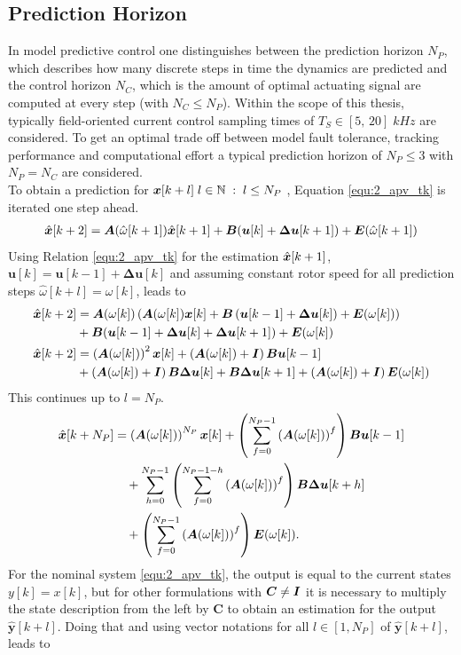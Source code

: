\subsection{Prediction Horizon} \label{sec:prediction_horizon}
In model predictive control one distinguishes between the prediction horizon $N_P$, which describes how many discrete steps in time the dynamics are predicted and the control horizon $N_C$, which is the amount of optimal actuating signal are computed at every step (with $N_C \le N_P$).
Within the scope of this thesis, typically field-oriented current control sampling times of $T_S \in [5,\, 20]\;\si{kHz}$ are considered. To get an optimal trade off between model fault tolerance, tracking performance and computational effort a typical prediction horizon of $N_P \le 3$  with $N_P = N_C$ are considered.\\
To obtain a prediction for  ${\bm{x}}[k+l]\; l\in \mathbb{N}\;:\; l\le N_P $ , Equation \eqref{equ:2_apv_tk} is iterated one step ahead.
\begin{align*}
	\hat{\bm{x}}[k+2] = \bm{A}(\hat{\omega}[k+1]) \hat{\bm{x}}[k+1] + \bm{B} (\bm{u}[k] + \bm{\Delta u}[k+1] ) + \bm{E}(\hat{\omega}[k+1])
\end{align*}
Using Relation \eqref{equ:2_apv_tk} for the estimation $\hat{\bm{x}}[k+1]$, $\bm{u}[k]  = \bm{u}[k-1] + \bm{\Delta u}[k] $ and assuming constant rotor speed for all prediction steps $\hat{\omega}[k+l] = \omega[k]$, leads to
\begin{align*}
	\hat{\bm{x}}[k+2] &= \bm{A}(\omega[k]) \left(\bm{A}(\omega[k]) {\bm{x}}[k] + \bm{B} \left(\bm{u}[k-1] + \bm{\Delta u}[k] \right) + \bm{E}(\omega[k]) \right) \\ 
	&+  \bm{B} (\bm{u}[k-1] + \bm{\Delta u}[k] + \bm{\Delta u}[k+1]) + \bm{E}(\omega[k]) \\
	\hat{\bm{x}}[k+2] &= \left(\bm{A}(\omega[k]) \right)^2 {\bm{x}}[k] + \left(\bm{A}(\omega[k]) + \bm{I} \right) \bm{B} \bm{u}[k-1] \\ & + \left(\bm{A}(\omega[k]) + \bm{I} \right) \bm{B} \bm{\Delta u} [k] + \bm{B} \bm{\Delta u} [k+1] + \left(\bm{A}(\omega[k]) + \bm{I} \right) \bm{E}(\omega[k])
\end{align*}
This continues up to $l=N_P$.
\begin{align*}
	\hat{\bm{x}}[k+N_P]
	&= \left(\bm{A}(\omega[k])\right)^{N_P}{\bm{x}}[k]
	+ \left(\sum_{f=0}^{N_P-1}\left(\bm{A}(\omega[k])\right)^f\right)
	\bm{B}\bm{u}[k-1] \\
	&\quad
	+ \sum_{h=0}^{N_P-1}
	\left(
	\sum_{f=0}^{N_P-1-h}
	\left(\bm{A}(\omega[k])\right)^f
	\right)
	\bm{B}\bm{\Delta u}[k+h] \\
	&\quad
	+ \left(\sum_{f=0}^{N_P-1}\left(\bm{A}(\omega[k])\right)^f\right)
	\bm{E}(\omega[k]) .
\end{align*}
For the nominal system \eqref{equ:2_apv_tk}, the output is equal to the current states $y[k] = x[k]$, but for other formulations with $\bm{C}  \ne \bm{I}$ it is necessary to multiply the state description from the left by $\bm{C}$ to obtain an estimation for the output $\hat{\bm{y}}[k+l]$. Doing that and using vector notations for all $l\in [1, N_P]$ of $\hat{\bm{y}}[k+l]$, leads to 

